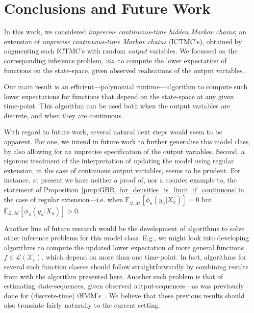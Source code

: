 \documentclass[twoside,11pt]{article}
\newcommand{\states}{\mathcal{X}}
\newcommand{\lexp}{\underline{\mathbb{E}}_{\rateset,\mathcal{M}}}
\newcommand{\uexp}{\overline{\mathbb{E}}_{\rateset,\mathcal{M}}}
\newcommand{\gambles}{\mathcal{L}}
\newcommand{\rateset}{\mathcal{Q}}
\begin{document}
\section{Conclusions and Future Work}\label{sec:conclusions}

In this work, we considered \emph{imprecise continuous-time hidden Markov chains}; an extension of \emph{imprecise continuous-time Markov chains} (ICTMC's), obtained by augmenting such ICTMC's with random \emph{output} variables. We focussed on the corresponding inference problem, \emph{viz.} to compute the lower expectation of functions on the state-space, given observed realisations of the output variables. 

Our main result is an efficient---polynomial runtime---algorithm to compute such lower expectations for functions that depend on the state-space at any given time-point. This algorithm can be used both when the output variables are discrete, and when they are continuous.

With regard to future work, several natural next steps would seem to be apparent. For one, we intend in future work to further generalise this model class, by also allowing for an imprecise specification of the output variables. Second, a rigorous treatment of the interpretation of updating the model using regular extension, in the case of continuous output variables, seems to be prudent. For instance, at present we have neither a proof of, nor a counter example to, the statement of Proposition~\ref{prop:GBR_for_densities_is_limit_if_continuous} in the case of regular extension---i.e. when $\lexp[\phi_u(y_u\vert X_u)]=0$ but $\uexp[\phi_u(y_u\vert X_u)]>0$.

Another line of future research would be the development of algorithms to solve other inference problems for this model class. E.g., we might look into developing algorithms to compute the updated lower expectation of more general functions $f\in\gambles(\states_v)$, which depend on more than one time-point. In fact, algorithms for several such function classes should follow straightforwardly by combining results from \cite{krak2016ictmc} with the algorithm presented here. Another such problem is that of estimating state-sequences, given observed output-sequences---as was previously done for (discrete-time) iHMM's~\citep{DeBock:2014ts}. We believe that these previous results should also translate fairly naturally to the current setting.
\end{document}
